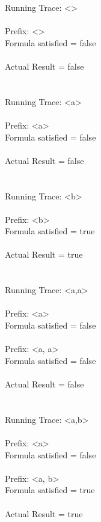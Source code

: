 \noindent Running Trace: \textless \textgreater\\
\\
  Prefix: \textless \textgreater\\
  Formula satisfied = false\\
\\
  Actual Result = false\\
\\
\\
Running Trace: \textless a\textgreater\\
\\
  Prefix: \textless a\textgreater\\
  Formula satisfied = false\\
\\
  Actual Result = false\\
\\
\\
Running Trace: \textless b\textgreater\\
\\
  Prefix: \textless b\textgreater\\
  Formula satisfied = true\\
\\
  Actual Result = true\\
\\
\\
Running Trace: \textless a,a\textgreater\\
\\
  Prefix: \textless a\textgreater\\
  Formula satisfied = false\\
\\
  Prefix: \textless a, a\textgreater\\
  Formula satisfied = false\\
\\
  Actual Result = false\\
\\
\\
Running Trace: \textless a,b\textgreater\\
\\
  Prefix: \textless a\textgreater\\
  Formula satisfied = false\\
\\
  Prefix: \textless a, b\textgreater\\
  Formula satisfied = true\\
\\
  Actual Result = true\\
\\
\\
\newpage

